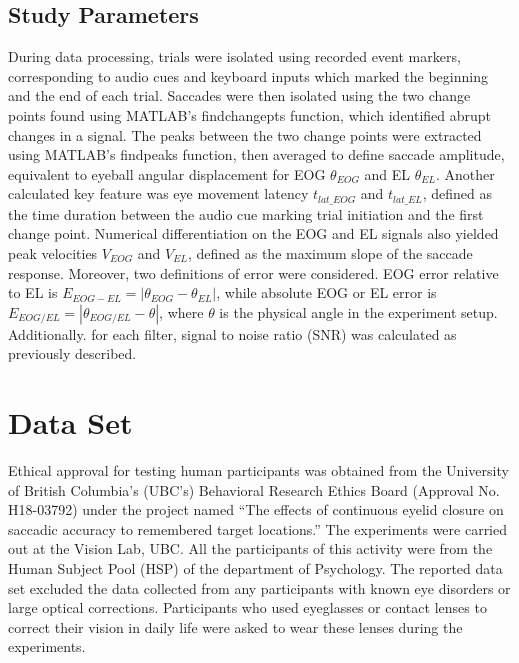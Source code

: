 \documentclass[transmag]{IEEEtran}
\begin{document}
\subsection{Study Parameters}

During data processing, trials were isolated using recorded event markers, corresponding to audio cues and keyboard inputs which marked the beginning and the end of each trial. Saccades were then isolated using the two change points found using MATLAB's findchangepts function, which identified abrupt changes in a signal. The peaks between the two change points were extracted using MATLAB's findpeaks function, then averaged to define saccade amplitude, equivalent to eyeball angular displacement for EOG $\theta_{EOG}$ and EL $\theta_{EL}$. Another calculated key feature was eye movement latency $t_{lat\_EOG}$ and $t_{lat\_EL}$, defined as the time duration between the audio cue marking trial initiation and the first change point. Numerical differentiation on the EOG and EL signals also yielded peak velocities $V_{EOG}$ and $V_{EL}$, defined as the maximum slope of the saccade response. Moreover, two definitions of error were considered. EOG error relative to EL is $E_{EOG - EL} = |\theta_{EOG} - \theta_{EL}|$, while absolute EOG or EL error is $E_{EOG/EL} = |\theta_{EOG/EL} - \theta|$, where $\theta$ is the physical angle in the experiment setup. Additionally. for each filter, signal to noise ratio (SNR) was calculated as previously described.


\section{Data Set}

Ethical approval for testing human participants was obtained from the University of British Columbia’s (UBC's) Behavioral Research Ethics Board (Approval No. H18-03792) under the project named “The effects of continuous eyelid closure on saccadic accuracy to remembered target locations.”  The experiments were carried out at the Vision Lab, UBC. All the participants of this activity were from the Human Subject Pool (HSP) of the department of Psychology. The reported data set excluded the data collected from any participants with known eye disorders or large optical corrections. Participants who used eyeglasses or contact lenses to correct their vision in daily life were asked to wear these lenses during the experiments. 
\end{document}
